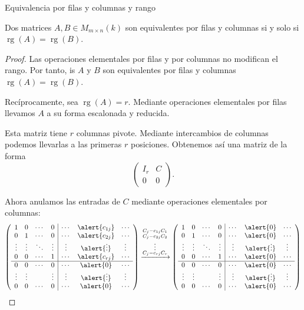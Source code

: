 \begin{frame}[allowframebreaks, t]
{Equivalencia por filas y columnas y rango}

\begin{theorem}
Dos matrices \(A,B\in M_{m\times n}(k)\) son equivalentes por filas
y columnas si y solo si
\(
\operatorname{rg}(A)=\operatorname{rg}(B).
\)
\end{theorem}


\begin{proof}
Las operaciones elementales por filas y por columnas no modifican
el rango. Por tanto, is $A$ y $B$ son equivalentes por filas y columnas
\(
\operatorname{rg}(A)=\operatorname{rg}(B).
\)

Recíprocamente, sea
\(
\operatorname{rg}(A)=r.
\)
Mediante operaciones elementales por filas llevamos \(A\) a su forma
escalonada y reducida.

Esta matriz tiene \(r\) columnas pivote. Mediante intercambios de
columnas podemos llevarlas a las primeras \(r\) posiciones. Obtenemos
así una matriz de la forma
\[
\left(
\begin{array}{c|c}
I_r&C\\
\hline
0&0
\end{array}
\right).
\]

\framebreak

Ahora anulamos las entradas de \(C\) mediante operaciones elementales
por columnas:
\[
\left(
\begin{array}{cccc|ccc}
1 & 0 & \cdots & 0
  & \cdots
  & \alert{c_{1j}}
  & \cdots\\
0 & 1 & \cdots & 0
  & \cdots
  & \alert{c_{2j}}
  & \cdots\\
\vdots & \vdots & \ddots & \vdots
  & \vdots
  & \alert{\vdots}
  & \vdots\\
0 & 0 & \cdots & 1
  & \cdots
  & \alert{c_{rj}}
  & \cdots\\
\hline
0 & 0 & \cdots & 0
  & \cdots
  & \alert{0}
  & \cdots\\
\vdots & \vdots &        & \vdots
  & \vdots
  & \alert{\vdots}
  & \vdots\\
0 & 0 & \cdots & 0
  & \cdots
  & \alert{0}
  & \cdots
\end{array}
\right)
\xrightarrow{\substack{C_j-c_{1j}C_1\\ C_j-c_{2j}C_2\\\vdots\\ C_j-c_{rj}C_r}}
\left(
\begin{array}{cccc|ccc}
1 & 0 & \cdots & 0
  & \cdots
  & \alert{0}
  & \cdots\\
0 & 1 & \cdots & 0
  & \cdots
  & \alert{0}
  & \cdots\\
\vdots & \vdots & \ddots & \vdots
  & \vdots
  & \alert{\vdots}
  & \vdots\\
0 & 0 & \cdots & 1
  & \cdots
  & \alert{0}
  & \cdots\\
\hline
0 & 0 & \cdots & 0
  & \cdots
  & \alert{0}
  & \cdots\\
\vdots & \vdots &        & \vdots
  & \vdots
  & \alert{\vdots}
  & \vdots\\
0 & 0 & \cdots & 0
  & \cdots
  & \alert{0}
  & \cdots
\end{array}
\right)
\]



\end{proof}
\end{frame}
